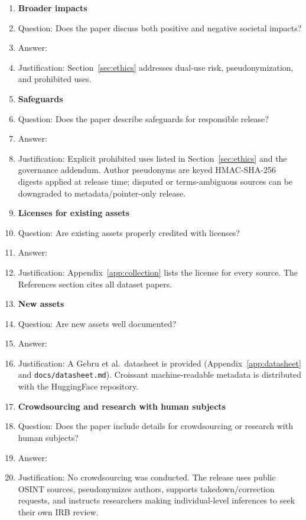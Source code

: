 \documentclass{article}
\begin{document}
\begin{enumerate}
\item {\bf Broader impacts}
    \item[] Question: Does the paper discuss both positive and negative societal impacts?
    \item[] Answer: \answerYes{}
    \item[] Justification: Section~\ref{sec:ethics} addresses dual-use risk, pseudonymization, and prohibited uses.

\item {\bf Safeguards}
    \item[] Question: Does the paper describe safeguards for responsible release?
    \item[] Answer: \answerYes{}
    \item[] Justification: Explicit prohibited uses listed in Section~\ref{sec:ethics} and the governance addendum. Author pseudonyms are keyed HMAC-SHA-256 digests applied at release time; disputed or terms-ambiguous sources can be downgraded to metadata/pointer-only release.

\item {\bf Licenses for existing assets}
    \item[] Question: Are existing assets properly credited with licenses?
    \item[] Answer: \answerYes{}
    \item[] Justification: Appendix~\ref{app:collection} lists the license for every source. The References section cites all dataset papers.

\item {\bf New assets}
    \item[] Question: Are new assets well documented?
    \item[] Answer: \answerYes{}
    \item[] Justification: A Gebru et al.\ datasheet is provided (Appendix~\ref{app:datasheet} and \texttt{docs/datasheet.md}). Croissant machine-readable metadata is distributed with the HuggingFace repository.

\item {\bf Crowdsourcing and research with human subjects}
    \item[] Question: Does the paper include details for crowdsourcing or research with human subjects?
    \item[] Answer: \answerNA{}
    \item[] Justification: No crowdsourcing was conducted. The release uses public OSINT sources, pseudonymizes authors, supports takedown/correction requests, and instructs researchers making individual-level inferences to seek their own IRB review.


\end{enumerate}
\end{document}
